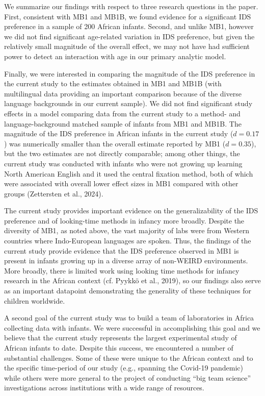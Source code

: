 \documentclass[
  ,man,floatsintext]{apa6}
\begin{document}
We summarize our findings with respect to three research questions in the paper. First, consistent with MB1 and MB1B, we found evidence for a significant IDS preference in a sample of 200 African infants. Second, and unlike MB1, however we did not find significant age-related variation in IDS preference, but given the relatively small magnitude of the overall effect, we may not have had sufficient power to detect an interaction with age in our primary analytic model.

Finally, we were interested in comparing the magnitude of the IDS preference in the current study to the estimates obtained in MB1 and MB1B (with multilingual data providing an important comparison because of the diverse language backgrounds in our current sample). We did not find significant study effects in a model comparing data from the current study to a method- and language-background matched sample of infants from MB1 and MB1B. The magnitude of the IDS preference in African infants in the current study (\(d = 0.17\)) was numerically smaller than the overall estimate reported by MB1 (\(d = 0.35\)), but the two estimates are not directly comparable; among other things, the current study was conducted with infants who were not growing up learning North American English and it used the central fixation method, both of which were associated with overall lower effect sizes in MB1 compared with other groups (Zettersten et al., 2024).

The current study provides important evidence on the generalizability of the IDS preference and of looking-time methods in infancy more broadly. Despite the diversity of MB1, as noted above, the vast majority of labs were from Western countries where Indo-European languages are spoken. Thus, the findings of the current study provide evidence that the IDS preference observed in MB1 is present in infants growing up in a diverse array of non-WEIRD environments. More broadly, there is limited work using looking time methods for infancy research in the African context (cf. Pyykkö et al., 2019), so our findings also serve as an important datapoint demonstrating the generality of these techniques for children worldwide.

A second goal of the current study was to build a team of laboratories in Africa collecting data with infants. We were successful in accomplishing this goal and we believe that the current study represents the largest experimental study of African infants to date. Despite this success, we encountered a number of substantial challenges. Some of these were unique to the African context and to the specific time-period of our study (e.g., spanning the Covid-19 pandemic) while others were more general to the project of conducting ``big team science'' investigations across institutions with a wide range of resources.
\end{document}
